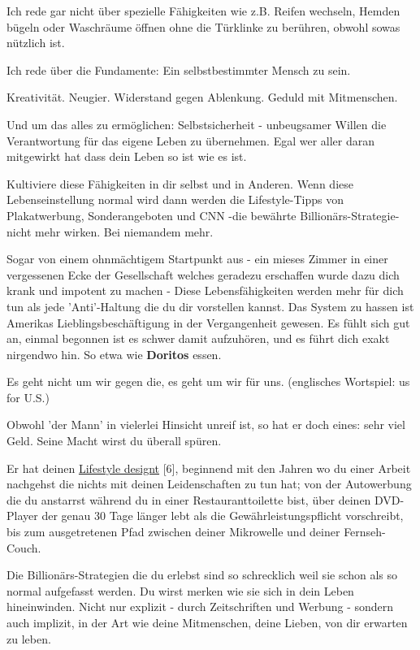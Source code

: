 \documentclass[10pt,a4paper,ngerman,twoside]{article} %
\begin{document}
Ich rede gar nicht über spezielle Fähigkeiten wie z.B. Reifen wechseln, Hemden bügeln oder Waschräume öffnen ohne die Türklinke zu berühren, obwohl sowas nützlich ist.

Ich rede über die Fundamente: Ein selbstbestimmter Mensch zu sein.

Kreativität. Neugier. Widerstand gegen Ablenkung. Geduld mit Mitmenschen.

Und um das alles zu ermöglichen: Selbstsicherheit - unbeugsamer Willen die Verantwortung für das eigene Leben zu übernehmen. Egal wer aller daran mitgewirkt hat dass dein Leben so ist wie es ist.

Kultiviere diese Fähigkeiten in dir selbst und in Anderen. Wenn diese Lebenseinstellung normal wird dann werden die Lifestyle-Tipps von Plakatwerbung, Sonderangeboten und CNN -die bewährte Billionärs-Strategie- nicht mehr wirken. Bei niemandem mehr.

Sogar von einem ohnmächtigem Startpunkt aus - ein mieses Zimmer in einer vergessenen Ecke der Gesellschaft welches geradezu erschaffen wurde dazu dich krank und impotent zu machen - Diese Lebensfähigkeiten werden mehr für dich tun als jede 'Anti'-Haltung die du dir vorstellen kannst. Das System zu hassen ist Amerikas Lieblingsbeschäftigung in der Vergangenheit gewesen. Es fühlt sich gut an, einmal begonnen ist es schwer damit aufzuhören, und es führt dich exakt nirgendwo hin. So etwa wie \textbf{Doritos} essen.

Es geht nicht um wir gegen die, es geht um wir für uns. (englisches Wortspiel: us for U.S.)

Obwohl 'der Mann' in vielerlei Hinsicht unreif ist, so hat er doch eines: sehr viel Geld. Seine Macht wirst du überall spüren. 


Er hat deinen \href{http://www.raptitude.com/2010/07/your-lifestyle-has-already-been-designed/}{Lifestyle designt}  [6], beginnend mit den Jahren wo du einer Arbeit nachgehst die nichts mit deinen Leidenschaften zu tun hat; von der Autowerbung die du anstarrst während du in einer Restauranttoilette bist, über deinen DVD-Player der genau 30 Tage länger lebt als die  Gewährleistungspflicht vorschreibt, bis zum ausgetretenen Pfad zwischen deiner Mikrowelle und deiner Fernseh-Couch.


Die Billionärs-Strategien die du erlebst sind so schrecklich weil sie schon als so normal aufgefasst werden. Du wirst merken wie sie sich in dein Leben hineinwinden. Nicht nur explizit - durch Zeitschriften und Werbung - sondern auch implizit, in der Art wie deine Mitmenschen, deine Lieben, von dir erwarten zu leben.
\end{document}
